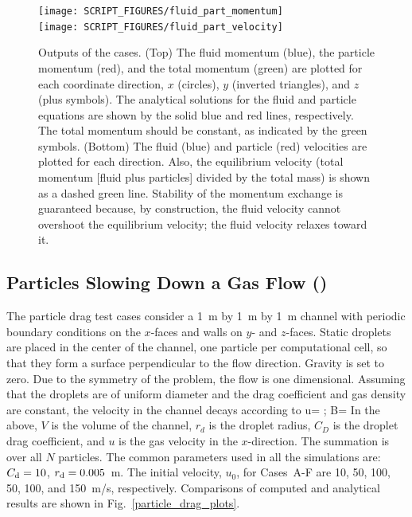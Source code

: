 \documentclass[11pt]{book}
\begin{document}
\begin{figure}[h]
\centering
\texttt{[image: SCRIPT\_FIGURES/fluid\_part\_momentum]}\\
\texttt{[image: SCRIPT\_FIGURES/fluid\_part\_velocity]}
\caption[Test of fluid-particle momentum transfer for nonstationary particles]{Outputs of the  cases.  (Top) The fluid momentum (blue), the particle momentum (red), and the total momentum (green) are plotted for each coordinate direction, $x$ (circles), $y$ (inverted triangles), and $z$ (plus symbols).  The analytical solutions for the fluid and particle equations are shown by the solid blue and red lines, respectively. The total momentum should be constant, as indicated by the green symbols. (Bottom) The fluid (blue) and particle (red) velocities are plotted for each direction.  Also, the equilibrium velocity (total momentum [fluid plus particles] divided by the total mass) is shown as a dashed green line.  Stability of the momentum exchange is guaranteed because, by construction, the fluid velocity cannot overshoot the equilibrium velocity; the fluid velocity relaxes toward it.}
\label{fig_fluid_part_mom}
\end{figure}


\subsection{Particles Slowing Down a Gas Flow (\texorpdfstring{}{particle\_drag})}
\label{particle_drag}
\label{particle_drag_U10_N16}
\label{particle_drag_U50_N16}
\label{particle_drag_U100_N16}
\label{particle_drag_U50_N1600}
\label{particle_drag_U100_N1600}
\label{particle_drag_U150_N1600}

The particle drag test cases consider a 1~m by 1~m by 1~m channel with periodic boundary conditions on the $x$-faces and  walls on $y$- and $z$-faces. Static droplets are placed in the center of the channel, one particle per computational cell, so that they form a surface perpendicular to the flow direction. Gravity is set to zero. Due to the symmetry of the problem, the flow is one dimensional. Assuming that the droplets are of uniform diameter  and the drag coefficient and gas density are constant, the velocity in the channel decays according to
\be u=  \quad ; \quad B= \ee
In the above, $V$ is the volume of the channel, $r_{d}$ is the droplet radius, $C_{D}$ is the droplet drag coefficient, and $u$ is the gas velocity in the $x$-direction. The summation is over all $N$ particles.
The common parameters used in all the simulations are: $C_{\rm d}=10$, $r_{\rm d}=0.005$~m. The initial velocity, $u_0$, for Cases~A-F are 10, 50, 100, 50, 100, and 150~m/s, respectively. Comparisons of computed and analytical results are shown in Fig.~\ref{particle_drag_plots}.
\end{document}
